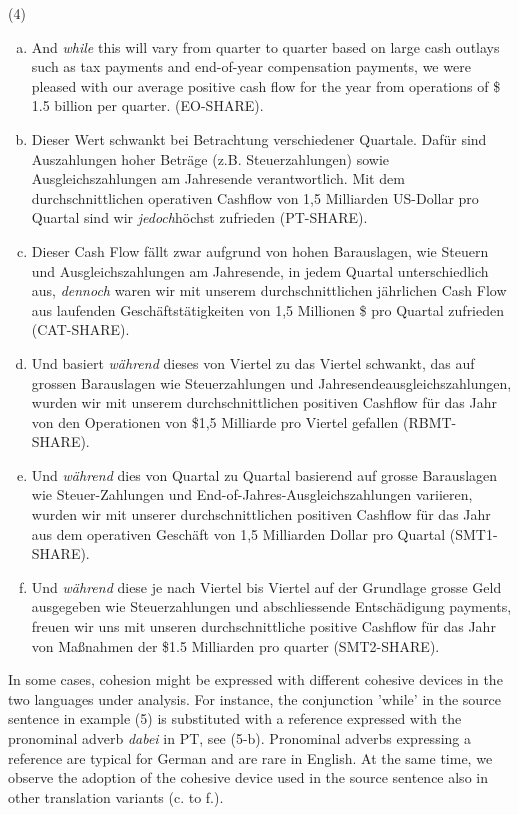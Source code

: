 \documentclass[output=paper]{LSP/langsci}
\begin{document}
\noindent (4)

\begin{enumerate}[a)]
\item And \textit{while} this will vary from quarter to quarter based on large cash outlays such as tax payments and end-of-year compensation payments, we were pleased with our average positive cash flow for the year from operations of \$ 1.5 billion per quarter. (EO-SHARE).
\item Dieser Wert schwankt bei Betrachtung verschiedener Quartale. Dafür sind Auszahlungen hoher Beträge (z.B. Steuerzahlungen) sowie Ausgleichszahlungen am Jahresende verantwortlich. Mit dem durchschnittlichen operativen Cashflow von 1,5 Milliarden US-Dollar pro Quartal sind wir \textit{jedoch}höchst zufrieden (PT-SHARE).
\item Dieser Cash Flow fällt zwar aufgrund von hohen Barauslagen, wie Steuern und Ausgleichszahlungen am Jahresende, in jedem Quartal unterschiedlich aus, \textit{dennoch} waren wir mit unserem durchschnittlichen jährlichen Cash Flow aus laufenden Geschäftstätigkeiten von 1,5 Millionen \$ pro Quartal zufrieden (CAT-SHARE).
\item Und basiert \textit{während} dieses von Viertel zu das Viertel schwankt, das auf grossen Barauslagen wie Steuerzahlungen und Jahresendeausgleichszahlungen, wurden wir mit unserem durchschnittlichen positiven Cashflow für das Jahr von den Operationen von \$1,5 Milliarde pro Viertel gefallen (RBMT-SHARE).
\item Und \textit{während} dies von Quartal zu Quartal basierend auf grosse Barauslagen wie Steuer-Zahlungen und End-of-Jahres-Ausgleichszahlungen variieren, wurden wir mit unserer durchschnittlichen positiven Cashflow für das Jahr aus dem operativen Geschäft von 1,5 Milliarden Dollar pro Quartal (SMT1-SHARE).
\item Und \textit{während} diese je nach Viertel bis Viertel auf der Grundlage grosse Geld ausgegeben wie Steuerzahlungen und abschliessende Entschädigung payments, freuen wir uns mit unseren durchschnittliche positive Cashflow für das Jahr von Maßnahmen der \$1.5 Milliarden pro quarter (SMT2-SHARE).
\end{enumerate}

In some cases, cohesion might be expressed with different cohesive devices in the two languages under analysis. For instance, the conjunction 'while' in the source sentence in example (5) is substituted with a reference expressed with the pronominal adverb \textit{dabei} in PT, see (5-b). Pronominal adverbs expressing a reference are typical for German and are rare in English. At the same time, we observe the adoption of the cohesive device used in the source sentence also in other translation variants (c. to f.).
\end{document}
